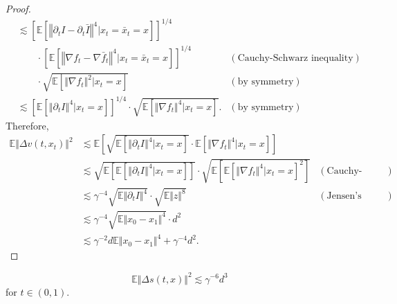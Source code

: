 \begin{proof}
$$\begin{aligned}
        &\lesssim\left[\mathbb{E}[\left\Vert\partial_tI-\partial_t\bar{I}\right\Vert^4|x_t=\bar{x}_t=x]\right]^{1/4}\\
        &\qquad\cdot\left[\mathbb{E}[\left\Vert\nabla f_t-\nabla\bar{f}_t\right\Vert^4|x_t=\bar{x}_t=x]\right]^{1/4}&(\text{Cauchy-Schwarz inequality})\\
        &\qquad\cdot\sqrt{\mathbb{E}[\Vert\nabla f_t\Vert^2|x_t=x]}&(\text{by symmetry})\\
        &\lesssim\left[\mathbb{E}[\left\Vert\partial_tI\right\Vert^4|x_t=x]\right]^{1/4}\cdot\sqrt{\mathbb{E}[\Vert\nabla f_t\Vert^4|x_t=x]}.&(\text{by symmetry})
    \end{aligned}$$
    Therefore, $$\begin{aligned}
        \mathbb{E}\Vert\Delta v(t,x_t)\Vert^2
        &\lesssim\mathbb{E}\left[\sqrt{\mathbb{E}[\left\Vert\partial_tI\right\Vert^4|x_t=x]}\cdot\mathbb{E}[\Vert\nabla f_t\Vert^4|x_t=x]\right]\\
        &\lesssim\sqrt{\mathbb{E}\left[\mathbb{E}[\left\Vert\partial_tI\right\Vert^4|x_t=x]\right]}\cdot\sqrt{\mathbb{E}\left[\mathbb{E}[\Vert\nabla f_t\Vert^4|x_t=x]^2\right]}&(\text{Cauchy-Schwarz inequality})\\
        &\lesssim\gamma^{-4}\sqrt{\mathbb{E}\Vert\partial_tI\Vert^4}\cdot\sqrt{\mathbb{E}\Vert z\Vert^{8}}&(\text{Jensen's inequality})\\
        &\lesssim\gamma^{-4}\sqrt{\mathbb{E}\Vert x_0-x_1\Vert^4}\cdot d^2\\
        &\lesssim\gamma^{-2}d\mathbb{E}\Vert x_0-x_1\Vert^4+\gamma^{-4}d^2.
    \end{aligned}$$
\end{proof}

\begin{lemma}
    $$\mathbb{E}\Vert\Delta s(t,x)\Vert^2\lesssim\gamma^{-6}d^3$$
    for $t\in(0,1)$.
    \label{lem:s-laplace}
\end{lemma}

